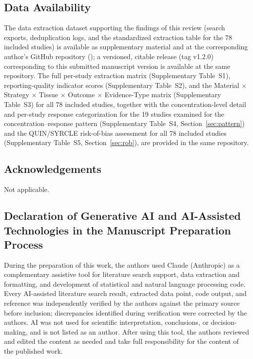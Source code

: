 \documentclass[5p,times,twocolumn]{elsarticle}
\begin{document}
\subsection*{Data Availability}

The data extraction dataset supporting the findings of this review (search exports, deduplication logs, and the standardized extraction table for the 78 included studies) is available as supplementary material and at the corresponding author's GitHub repository (); a versioned, citable release (tag v1.2.0) corresponding to this submitted manuscript version is available at the same repository. The full per-study extraction matrix (Supplementary Table~S1), reporting-quality indicator scores (Supplementary Table~S2), and the Material $\times$ Strategy $\times$ Tissue $\times$ Outcome $\times$ Evidence-Type matrix (Supplementary Table~S3) for all 78 included studies, together with the concentration-level detail and per-study response categorization for the 19 studies examined for the concentration--response pattern (Supplementary Table~S4, Section~\ref{sec:pattern}) and the QUIN/SYRCLE risk-of-bias assessment for all 78 included studies (Supplementary Table~S5, Section~\ref{sec:rob}), are provided in the same repository.

\subsection*{Acknowledgements}

Not applicable.

\subsection*{Declaration of Generative AI and AI-Assisted Technologies in the Manuscript Preparation Process}

During the preparation of this work, the authors used Claude (Anthropic) as a complementary assistive tool for literature search support, data extraction and formatting, and development of statistical and natural language processing code. Every AI-assisted literature search result, extracted data point, code output, and reference was independently verified by the authors against the primary source before inclusion; discrepancies identified during verification were corrected by the authors. AI was not used for scientific interpretation, conclusions, or decision-making, and is not listed as an author. After using this tool, the authors reviewed and edited the content as needed and take full responsibility for the content of the published work.
\end{document}

